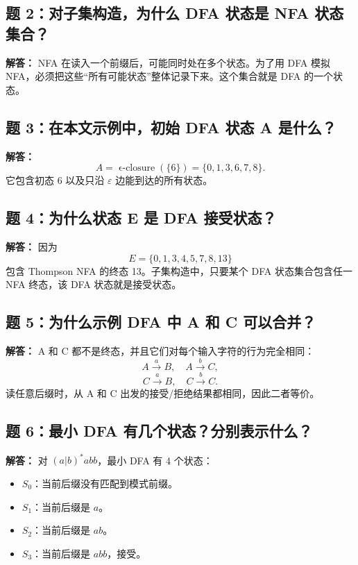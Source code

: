 \documentclass[UTF8,fontset=none,11pt]{ctexart}
\newcommand{\eps}{\varepsilon}
\newcommand{\eclose}{\operatorname{\epsilon\text{-}closure}}
\begin{document}
\subsection*{题 2：对子集构造，为什么 DFA 状态是 NFA 状态集合？}

\textbf{解答：} NFA 在读入一个前缀后，可能同时处在多个状态。为了用 DFA 模拟 NFA，必须把这些“所有可能状态”整体记录下来。这个集合就是 DFA 的一个状态。

\subsection*{题 3：在本文示例中，初始 DFA 状态 A 是什么？}

\textbf{解答：}
\[
A=\eclose(\{6\})=\{0,1,3,6,7,8\}.
\]
它包含初态 6 以及只沿 \(\eps\) 边能到达的所有状态。

\subsection*{题 4：为什么状态 E 是 DFA 接受状态？}

\textbf{解答：} 因为
\[
E=\{0,1,3,4,5,7,8,13\}
\]
包含 Thompson NFA 的终态 13。子集构造中，只要某个 DFA 状态集合包含任一 NFA 终态，该 DFA 状态就是接受状态。

\subsection*{题 5：为什么示例 DFA 中 A 和 C 可以合并？}

\textbf{解答：} A 和 C 都不是终态，并且它们对每个输入字符的行为完全相同：
\[
A \xrightarrow{a} B,\quad A \xrightarrow{b} C,
\]
\[
C \xrightarrow{a} B,\quad C \xrightarrow{b} C.
\]
读任意后缀时，从 A 和 C 出发的接受/拒绝结果都相同，因此二者等价。

\subsection*{题 6：最小 DFA 有几个状态？分别表示什么？}

\textbf{解答：} 对 \((a|b)^*abb\)，最小 DFA 有 4 个状态：

\begin{itemize}
  \item \(S_0\)：当前后缀没有匹配到模式前缀。
  \item \(S_1\)：当前后缀是 \(a\)。
  \item \(S_2\)：当前后缀是 \(ab\)。
  \item \(S_3\)：当前后缀是 \(abb\)，接受。
\end{itemize}
\end{document}
